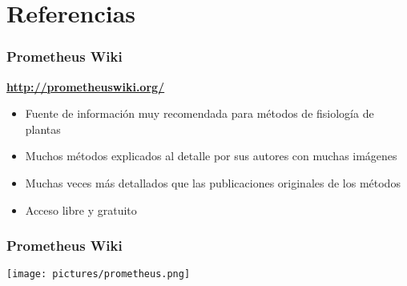 \documentclass[usepdftitle=false]{beamer}
\newcommand{\Blue}[1]{{\color{blue!50!black}\textbf{#1}}}
\newenvironment{changemargin}[2]{%
\begin{list}{}{%
\setlength{\topsep}{0pt}%
\setlength{\leftmargin}{#1}%
\setlength{\rightmargin}{#2}%
\setlength{\listparindent}{\parindent}%
\setlength{\itemindent}{\parindent}%
\setlength{\parsep}{\parskip}%
}%
\item[]}{\end{list}}
\begin{document}
\section{Referencias}

\begin{frame}
	\frametitle{Prometheus Wiki}

\Blue{ \huge \url{http://prometheuswiki.org/}}

\vspace{0.5 em}
\begin{itemize}[<+-| alert@+>]
	\item Fuente de información muy recomendada para métodos de fisiología de plantas	
	\item Muchos métodos explicados al detalle por sus autores con muchas imágenes 
	\item Muchas veces más detallados que las publicaciones originales de los métodos
	\item Acceso libre y gratuito
\end{itemize}
\end{frame}

\begin{frame}
	\frametitle{Prometheus Wiki}
	\begin{changemargin}{-2em}{-2em}
		\texttt{[image: pictures/prometheus.png]}
	\end{changemargin}
\end{frame}
\end{document}
